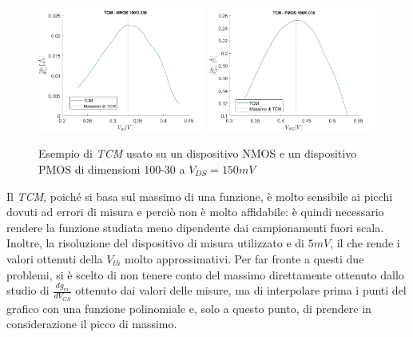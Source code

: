 \documentclass[12pt, letterpaper]{book}
\begin{document}
\begin{figure}[h!]
\centering
 \includegraphics[width=0.49\textwidth]{TCM-N4-100-30-NoFit}
 \includegraphics[width=0.49\textwidth]{TCM-P1-100-30-NoFit}
 \caption{Esempio di \emph{TCM} usato su un dispositivo NMOS e un dispositivo PMOS di dimensioni 100-30 a $V_{DS} = 150 mV$}
\end{figure}

Il \emph{TCM}, poiché si basa sul massimo di una funzione, è molto sensibile ai picchi dovuti ad errori di misura e perciò non è molto affidabile: è quindi necessario rendere la funzione studiata meno dipendente dai campionamenti fuori scala. Inoltre, la risoluzione del dispositivo di misura utilizzato e di $5 mV$, il che rende i valori ottenuti della $V_{th}$ molto approssimativi.
Per far fronte a questi due problemi, si è scelto di non tenere conto del massimo direttamente ottenuto dallo studio di $\frac{dg_m}{dV_{GS}}$ ottenuto dai valori delle misure, ma di interpolare prima i punti del grafico con una funzione polinomiale e, solo a questo punto, di prendere in considerazione il picco di massimo. \\
\end{document}
